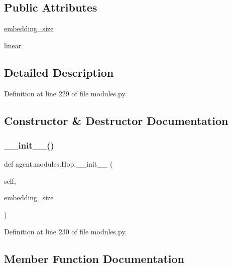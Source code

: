\subsection*{Public Attributes}
\begin{DoxyCompactItemize}
\item 
\hyperlink{classagent_1_1modules_1_1Hop_a9e81d98ac7db15a8fa8f03cfe85111cb}{embedding\+\_\+size}
\item 
\hyperlink{classagent_1_1modules_1_1Hop_a85391af3c7d5b4784a4b83129e854c36}{linear}
\end{DoxyCompactItemize}


\subsection{Detailed Description}


Definition at line 229 of file modules.\+py.



\subsection{Constructor \& Destructor Documentation}
\mbox{\label{classagent_1_1modules_1_1Hop_a3fcdab7229869eed8a4c831c55da4cfe}} 
\subsubsection{\texorpdfstring{\+\_\+\+\_\+init\+\_\+\+\_\+()}{\_\_init\_\_()}}
{\footnotesize\ttfamily def agent.\+modules.\+Hop.\+\_\+\+\_\+init\+\_\+\+\_\+ (\begin{DoxyParamCaption}\item[{}]{self,  }\item[{}]{embedding\+\_\+size }\end{DoxyParamCaption})}



Definition at line 230 of file modules.\+py.



\subsection{Member Function Documentation}
\mbox{\label{classagent_1_1modules_1_1Hop_a9b266c14ffbc2ae89147a1ade0b12897}} 
